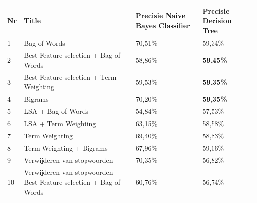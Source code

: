 \begin{table}[H]
\centering
\begin{adjustbox}{width=1\textwidth}
\begin{tabular}{|l|l|l|l|}
\hline
{\bf Nr} & {\bf {\bf Title}}                                                                  & {\bf Precisie Naive Bayes Classifier} & {\bf Precisie Decision Tree} \\ \hline
1        & Bag of Words                                                                         & 70,51\%                                 & 59,34\%                        \\ \hline
2        & Best Feature selection + Bag of Words                                                  & 58,86\%                                 & {\bf 59,45\%}                  \\ \hline
3        & Best Feature selection + Term Weighting                                      & 59,53\%                                 & {\bf 59,35\%}                  \\ \hline
4        & Bigrams                                                                   & 70,20\%                                 & {\bf 59,35\%}                  \\ \hline
5        & LSA + Bag of Words                                                                  & 54,84\%                                 & 57,53\%                        \\ \hline
6        & LSA + Term Weighting                                                         & 63,15\%                                 & 58,58\%                        \\ \hline
7        & Term Weighting                                                                       & 69,40\%                                 & 58,83\%                        \\ \hline
8        & Term Weighting + Bigrams                                                             & 67,96\%                                 & 59,06\%                        \\ \hline
9        & Verwijderen van stopwoorden                                                          & 70,35\%                                 & 56,82\%                        \\ \hline
10        & Verwijderen van stopwoorden + Best Feature selection + Bag of Words & 60,76\%                                 & 56,74\%                        \\ \hline

\end{tabular}
\end{adjustbox}
\end{table}
